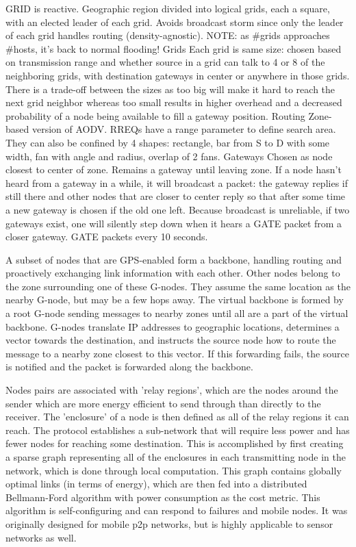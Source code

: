 \documentclass[conference]{IEEEtran}
\begin{document}
\cite{Liao01grid:a} GRID is reactive.
Geographic region divided into logical grids, each a square, with an elected leader of each grid.
Avoids broadcast storm since only the leader of each grid handles routing (density-agnostic).
NOTE: as #grids approaches #hosts, it's back to normal flooding!
Grids        
Each grid is same size: chosen based on transmission range and whether source in a grid can talk to 4 or 8 of the neighboring grids, with destination gateways in center or anywhere in those grids.
There is a trade-off between the sizes as too big will make it hard to reach the next grid neighbor whereas too small results in higher overhead and a decreased probability of a node being available to fill a gateway position.
Routing        
Zone-based version of AODV.
RREQs have a range parameter to define search area.
They can also be confined by 4 shapes: rectangle, bar from S to D with some width, fan with angle and radius, overlap of 2 fans.
Gateways        
Chosen as node closest to center of zone.
Remains a gateway until leaving zone.
If a node hasn't heard from a gateway in a while, it will broadcast a packet: the gateway replies if still there and other nodes that are closer to center reply so that after some time a new gateway is chosen if the old one left.
Because broadcast is unreliable, if two gateways exist, one will silently step down when it hears a GATE packet from a closer gateway.
GATE packets every 10 seconds.

\cite{Zaruba2003} A subset of nodes that are GPS-enabled form a backbone, handling routing and proactively exchanging link information with each other.
Other nodes belong to the zone surrounding one of these G-nodes.
They assume the same location as the nearby G-node, but may be a few hops away.
The virtual backbone is formed by a root G-node sending messages to nearby zones until all are a part of the virtual backbone.
G-nodes translate IP addresses to geographic locations, determines a vector towards the destination, and instructs the source node how to route the message to a nearby zone closest to this vector.
If this forwarding fails, the source is notified and the packet is forwarded along the backbone.

\cite{Rodoplu} Nodes pairs are associated with 'relay regions', which are the nodes around the sender which are more energy efficient to send through than directly to the receiver.  The 'enclosure' of a node is then defined as all of the relay regions it can reach.  The protocol establishes a sub-network that will require less power and has fewer nodes for reaching some destination.  This is accomplished by first creating a sparse graph representing all of the enclosures in each transmitting node in the network, which is done through local computation.  This graph contains globally optimal links (in terms of energy), which are then fed into a distributed Bellmann-Ford algorithm with power consumption as the cost metric.  This algorithm is self-configuring and can respond to failures and mobile nodes.  It was originally designed for mobile p2p networks, but is highly applicable to sensor networks as well.
\end{document}
